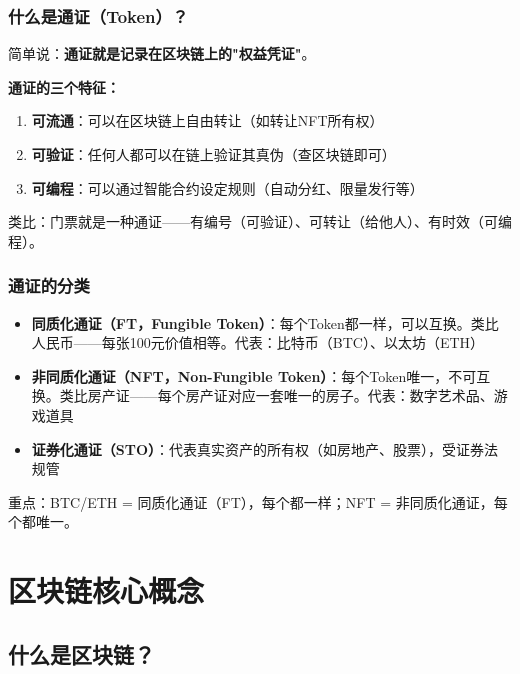 ﻿\documentclass[12pt,a4paper]{article}
\begin{document}
\subsubsection{什么是通证（Token）？}

简单说：\textbf{通证就是记录在区块链上的"权益凭证"}。

\begin{theorybox}
\textbf{通证的三个特征：}
\begin{enumerate}
\item \textbf{可流通}：可以在区块链上自由转让（如转让NFT所有权）
\item \textbf{可验证}：任何人都可以在链上验证其真伪（查区块链即可）
\item \textbf{可编程}：可以通过智能合约设定规则（自动分红、限量发行等）
\end{enumerate}
\end{theorybox}

类比：门票就是一种通证——有编号（可验证）、可转让（给他人）、有时效（可编程）。

\subsubsection{通证的分类}

\begin{itemize}[leftmargin=1.5em]
\item \textbf{同质化通证（FT，Fungible Token）}：每个Token都一样，可以互换。类比人民币——每张100元价值相等。代表：比特币（BTC）、以太坊（ETH）
\item \textbf{非同质化通证（NFT，Non-Fungible Token）}：每个Token唯一，不可互换。类比房产证——每个房产证对应一套唯一的房子。代表：数字艺术品、游戏道具
\item \textbf{证券化通证（STO）}：代表真实资产的所有权（如房地产、股票），受证券法规管
\end{itemize}

\begin{keypointbox}
重点：BTC/ETH = 同质化通证（FT），每个都一样；NFT = 非同质化通证，每个都唯一。
\end{keypointbox}

\section{区块链核心概念}

\subsection{什么是区块链？}
\end{document}
